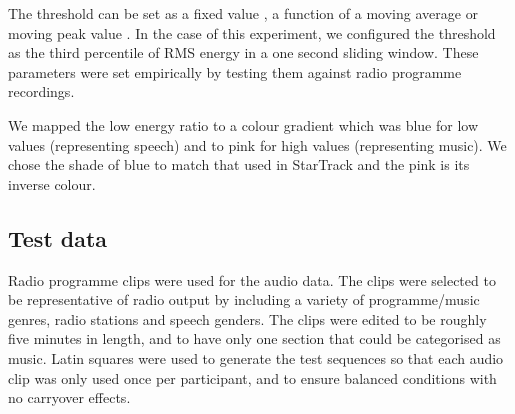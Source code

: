 The threshold can be set as a fixed value \citep{Liang2005}, a function of a moving average \citep{Ericsson2009} or
moving peak value \citep{Saunders1996}.  In the case of this experiment, we configured the threshold as the third
percentile of RMS energy in a one second sliding window. These parameters were set empirically by testing them against
radio programme recordings.

We mapped the low energy ratio to a colour gradient which was blue for low values (representing speech) and to pink
for high values (representing music). We chose the shade of blue to match that used in StarTrack and the pink is
its inverse colour.








\subsection{Test data}
Radio programme clips were used for the audio data. The clips were selected to be representative of radio output by
including a variety of programme/music genres, radio stations and speech genders. The clips were edited to be roughly
five minutes in length, and to have only one section that could be categorised as music. Latin squares were used to
generate the test sequences so that each audio clip was only used once per participant, and to ensure balanced
conditions with no carryover effects.

